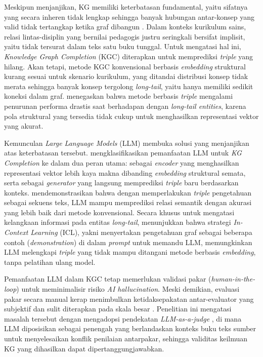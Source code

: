 \documentclass[../../thesis]{subfiles}
\begin{document}
Meskipun menjanjikan, KG memiliki keterbatasan fundamental, yaitu sifatnya yang
secara inheren tidak lengkap sehingga banyak hubungan antar-konsep yang valid
tidak tertangkap ketika graf dibangun \parencite{ji_survey_2022}. Dalam konteks kurikulum sains, relasi lintas-disiplin
yang bernilai pedagogis justru seringkali bersifat implisit, yaitu tidak
tersurat dalam teks satu buku tunggal. Untuk mengatasi hal ini,
\textit{Knowledge Graph Completion} (KGC) diterapkan untuk memprediksi
\textit{triple} yang hilang. Akan tetapi, metode KGC konvensional berbasis \textit{embedding} struktural kurang
sesuai untuk skenario kurikulum, yang ditandai distribusi konsep tidak merata
sehingga banyak konsep tergolong \textit{long-tail}, yaitu hanya memiliki sedikit
koneksi dalam graf. \textcite{wei_kicgpt_2023} menegaskan bahwa metode berbasis
\textit{triple} mengalami penurunan performa drastis saat berhadapan dengan
\textit{long-tail entities}, karena pola struktural yang tersedia tidak cukup untuk
menghasilkan representasi vektor yang akurat.

Kemunculan \textit{Large Language Models} (LLM) membuka solusi yang menjanjikan
atas keterbatasan tersebut. \textcite{pan_unifying_2024} mengklasifikasikan pemanfaatan LLM untuk
\textit{KG Completion} ke dalam dua peran utama: sebagai \textit{encoder} yang
menghasilkan representasi vektor lebih kaya makna dibanding \textit{embedding}
struktural semata, serta sebagai \textit{generator} yang langsung memprediksi
\textit{triple} baru berdasarkan konteks. \textcite{yao_exploring_2025} mendemonstrasikan
bahwa dengan memperlakukan \textit{triple} pengetahuan sebagai sekuens teks,
LLM mampu memprediksi relasi semantik dengan akurasi yang lebih baik dari metode
konvensional. Secara khusus untuk mengatasi kelangkaan informasi pada entitas
\textit{long-tail}, \textcite{wei_kicgpt_2023} menunjukkan bahwa strategi
\textit{In-Context Learning} (ICL), yakni menyertakan pengetahuan graf sebagai
beberapa contoh (\textit{demonstration}) di dalam \textit{prompt} untuk memandu
LLM, memungkinkan LLM melengkapi \textit{triple} yang tidak mampu ditangani metode
berbasis \textit{embedding}, tanpa pelatihan ulang model.

Pemanfaatan LLM dalam KGC tetap memerlukan validasi pakar
(\textit{human-in-the-loop}) untuk meminimalisir risiko \textit{AI hallucination}.
Meski demikian, evaluasi pakar secara manual kerap menimbulkan ketidaksepakatan
antar-evaluator yang subjektif dan sulit diterapkan pada skala besar
\parencite{gu_survey_2024}. Penelitian ini mengatasi masalah tersebut dengan
mengadopsi pendekatan \textit{LLM-as-a-judge} \parencite{gu_survey_2024}, di mana
LLM diposisikan sebagai penengah yang berlandaskan konteks buku teks sumber untuk
menyelesaikan konflik penilaian antarpakar, sehingga validitas keilmuan KG yang
dihasilkan dapat dipertanggungjawabkan.
\end{document}
